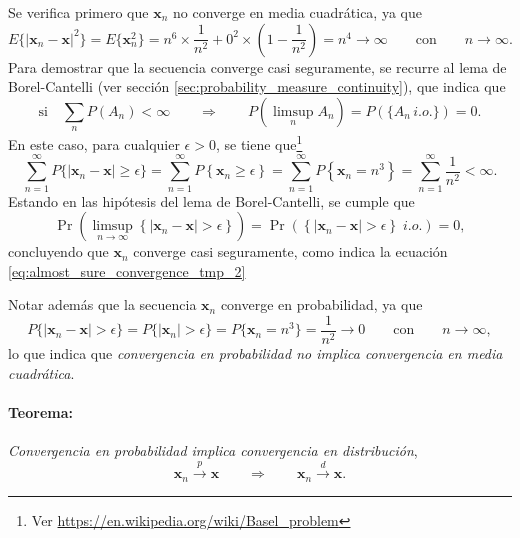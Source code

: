 \documentclass[a4paper]{report}
\newcommand{\x}{\mathbf{x}}
\begin{document}
Se verifica primero que \(\x_n\) no converge en media cuadrática, ya que
\[
  E\{|\x_n-\x|^2\}=E\{\x_n^2\}=n^6\times \frac{1}{n^2}+0^2\times \left(1-\frac{1}{n^2}\right)=n^4\to\infty\qquad\textrm{con}\qquad n\to\infty.
\]
Para demostrar que la secuencia converge casi seguramente, se recurre al lema de Borel-Cantelli (ver sección \ref{sec:probability_measure_continuity}), que indica que 
\[
 \textrm{si}\quad \sum_n P(A_n)<\infty\qquad\Rightarrow\qquad P\left(\limsup_n A_n\right) = P(\{A_n\,i.o.\})=0.
\]
En este caso, para cualquier \(\epsilon>0\), se tiene que\footnote{Ver \url{https://en.wikipedia.org/wiki/Basel_problem}}
\[
 \sum_{n=1}^\infty P\{|\x_n-\x|\geq\epsilon\}=\sum_{n=1}^\infty P\left\{\x_n\geq\epsilon\right\}
 =\sum_{n=1}^\infty P\left\{\x_n=n^3\right\}
 =\sum_{n=1}^\infty \frac{1}{n^2}
 <\infty.
\]
Estando en las hipótesis del lema de Borel-Cantelli, se cumple que
\[
  \Pr\left(\limsup_{n\to\infty}\left\{|\x_n-\x|>\epsilon \right\}\right)=\Pr\left(\left\{|\x_n-\x|>\epsilon \right\}\;i.o.\right)=0,
\]
concluyendo que \(\x_n\) converge casi seguramente, como indica la ecuación \ref{eq:almost_sure_convergence_tmp_2}

Notar además que la secuencia \(\x_n\) converge en probabilidad, ya que
\[
 P\{|\x_n-\x|>\epsilon\}=P\{|\x_n|>\epsilon\}=P\{\x_n=n^3\}=\frac{1}{n^2}\to 0\qquad\textrm{con}\qquad n\to\infty,
\]
lo que indica que \emph{convergencia en probabilidad no implica convergencia en media cuadrática}.

\paragraph{Teorema:} \emph{Convergencia en probabilidad implica convergencia en distribución},
\[
 \x_n\overset{p}{\longrightarrow}\x\qquad\Rightarrow\qquad\x_n\overset{d}{\longrightarrow}\x.
\]
\end{document}
